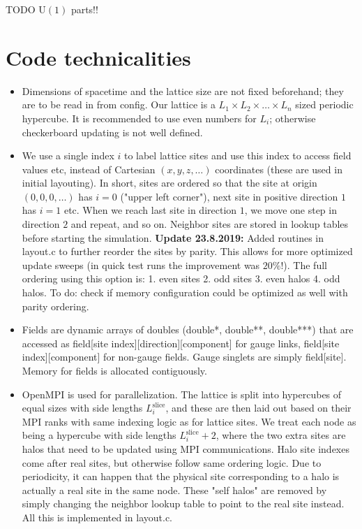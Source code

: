 \documentclass[11pt,a4paper]{article}
\newcommand\gr[1]{\mathrm{#1}}%
\newcommand\lauri[1]{{\color{myorange}#1}}
\begin{document}
\lauri{TODO $\gr{U(1)}$ parts!!}

\section{Code technicalities}

\begin{itemize}
	
	\item Dimensions of spacetime and the lattice size are not fixed beforehand; they are to be read in from config. Our lattice is a $L_1 \times L_2 \times \dots \times L_n$ sized periodic hypercube. It is recommended to use even numbers for $L_i$; otherwise checkerboard updating is not well defined. 
	
	\item We use a single index $i$ to label lattice sites and use this index to access field values etc, instead of Cartesian $(x, y, z, \dots)$ coordinates (these are used in initial layouting). In short, sites are ordered so that the site at origin $(0, 0, 0, \dots)$ has $i = 0$ ("upper left corner"), next site in positive direction $1$ has $i = 1$ etc. When we reach last site in direction $1$, we move one step in direction $2$ and repeat, and so on. Neighbor sites are stored in lookup tables before starting the simulation. \textbf{Update 23.8.2019:} Added routines in layout.c to further reorder the sites by parity. This allows for more optimized update sweeps (in quick test runs the improvement was $20\%$!). The full ordering using this option is: 1. even sites 2. odd sites 3. even halos 4. odd halos. To do: check if memory configuration could be optimized as well with parity ordering.
	
	\item Fields are dynamic arrays of doubles (double*, double**, double***) that are accessed as field[site index][direction][component] for gauge links, field[site index][component] for non-gauge fields. Gauge singlets are simply field[site]. Memory for fields is allocated contiguously. 
	
	\item OpenMPI is used for parallelization. The lattice is split into hypercubes of equal sizes with side lengths $L^\text{slice}_i$, and these are then laid out based on their MPI ranks with same indexing logic as for lattice sites. We treat each node as being a hypercube with side lengths $L^\text{slice}_i + 2$, where the two extra sites are halos that need to be updated using MPI communications. Halo site indexes come after real sites, but otherwise follow same ordering logic. Due to periodicity, it can happen that the physical site corresponding to a halo is actually a real site in the same node. These "self halos" are removed by simply changing the neighbor lookup table to point to the real site instead. All this is implemented in layout.c. 
	

\end{itemize}
\end{document}
